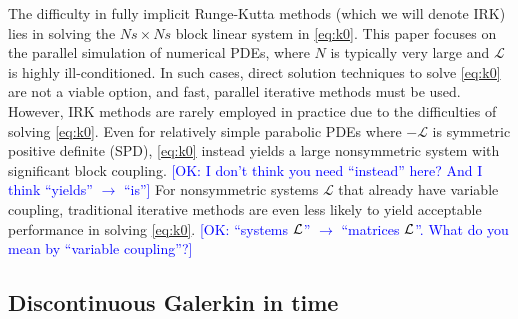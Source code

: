 \documentclass[review]{siamart}
\newcommand{\OK}[1]{\textcolor{blue}{[OK: #1]}}
\begin{document}
The difficulty in fully implicit Runge-Kutta methods (which we will denote IRK) lies in
solving the $Ns\times Ns$ block linear system in \eqref{eq:k0}. This paper focuses on the
parallel simulation of numerical PDEs, where $N$ is typically very large
and $\mathcal{L}$ is highly ill-conditioned. In such cases, direct
solution techniques to solve \eqref{eq:k0} are not a viable option, and fast, parallel
iterative methods must be used. However, IRK methods are rarely employed in practice due
to the difficulties of solving \eqref{eq:k0}. Even for relatively simple
parabolic PDEs where $-\mathcal{L}$ is symmetric positive definite (SPD), \eqref{eq:k0}
instead yields a large nonsymmetric system with significant block coupling. 
%
\OK{I don't think you need ``instead'' here? And I think ``yields'' $\to$ ``is''}
%
For
nonsymmetric systems $\mathcal{L}$ that already have variable coupling, traditional
iterative methods are even less likely to yield acceptable performance in solving
\eqref{eq:k0}.
%
\OK{``systems ${\cal L}$'' $\to$ ``matrices ${\cal L}$''. What do  you mean by ``variable coupling''?}
%

\subsection{Discontinuous Galerkin in time}\label{sec:intro:dg}
\end{document}
